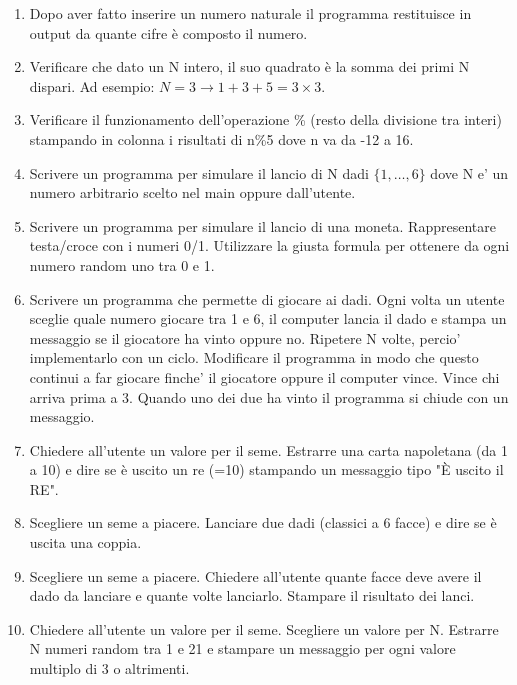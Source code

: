 \documentclass{article}
\begin{document}
\begin{enumerate}
\item Dopo aver fatto inserire un numero naturale il programma restituisce in output da quante cifre è composto il numero.

\item Verificare che dato un N intero, il suo quadrato è la somma dei primi N dispari. Ad esempio: $N=3 \rightarrow 1+3+5 = 3\times 3$.

\item Verificare il funzionamento dell'operazione \% (resto della divisione tra interi) stampando in colonna i risultati di n\%5 dove n va da -12 a 16.

\item Scrivere un programma per simulare il lancio di N dadi $\{1, \ldots, 6\}$ dove N e' un numero arbitrario scelto nel main oppure dall'utente.

\item Scrivere un programma per simulare il lancio di una moneta. Rappresentare testa/croce con i numeri 0/1. Utilizzare la giusta formula per ottenere da ogni numero random uno tra 0 e 1.

\item Scrivere un programma che permette di giocare ai dadi. Ogni volta un utente sceglie quale numero giocare tra 1 e 6, il computer lancia il dado e stampa un messaggio se il giocatore ha vinto oppure no. Ripetere N volte, percio' implementarlo con un ciclo. Modificare il programma in modo che questo continui a far giocare finche' il giocatore oppure il computer vince. Vince chi arriva prima a 3. Quando uno dei due ha vinto il programma si chiude con un messaggio.

\item Chiedere all'utente un valore per il seme. Estrarre una carta napoletana (da 1 a 10) e dire se è uscito un re (=10) stampando un messaggio tipo "È uscito il RE".

\item Scegliere un seme a piacere. Lanciare due dadi (classici a 6 facce) e dire se è uscita una coppia.

\item Scegliere un seme a piacere. Chiedere all'utente quante facce deve avere il dado da lanciare e quante volte lanciarlo. Stampare il risultato dei lanci.

\item Chiedere all'utente un valore per il seme. Scegliere un valore per N. Estrarre N numeri random tra 1 e 21 e stampare un messaggio per ogni valore multiplo di 3 o altrimenti.


\end{enumerate}
\end{document}
